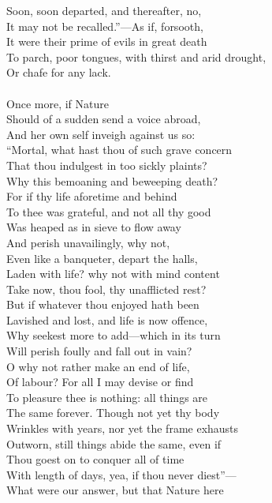Soon, soon departed, and thereafter, no,\\
It may not be recalled.''—As if, forsooth,\\
It were their prime of evils in great death\\
To parch, poor tongues, with thirst and arid drought,\\
Or chafe for any lack.\\
\\
Once more, if Nature\\
Should of a sudden send a voice abroad,\\
And her own self inveigh against us so:\\
``Mortal, what hast thou of such grave concern\\
That thou indulgest in too sickly plaints?\\
Why this bemoaning and beweeping death?\\
For if thy life aforetime and behind\\
To thee was grateful, and not all thy good\\
Was heaped as in sieve to flow away\\
And perish unavailingly, why not,\\
Even like a banqueter, depart the halls,\\
Laden with life? why not with mind content\\
Take now, thou fool, thy unafflicted rest?\\
But if whatever thou enjoyed hath been\\
Lavished and lost, and life is now offence,\\
Why seekest more to add—which in its turn\\
Will perish foully and fall out in vain?\\
O why not rather make an end of life,\\
Of labour? For all I may devise or find\\
To pleasure thee is nothing: all things are\\
The same forever. Though not yet thy body\\
Wrinkles with years, nor yet the frame exhausts\\
Outworn, still things abide the same, even if\\
Thou goest on to conquer all of time\\
With length of days, yea, if thou never diest''—\\
What were our answer, but that Nature here\\
